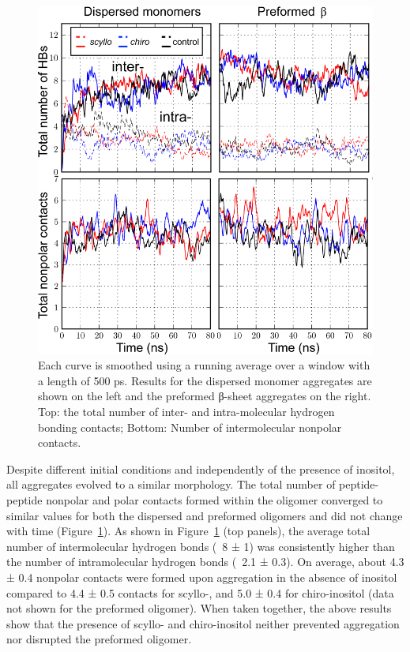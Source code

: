 \begin{figure}[htbp]
  \centering
  \includegraphics[width=4.5in]{figures/results1/GA4_paper_figures_submitted-5}
  \caption[Time evolution of peptide-peptide nonpolar and hydrogen bonding contacts in disordered aggregates in presence and absence of inositol (control).]{Each curve is smoothed using a running average over a window with a length of 500 ps. Results for the dispersed monomer aggregates are shown on the left and the preformed β-sheet aggregates on the right. Top: the total number of inter- and intra-molecular hydrogen bonding contacts; Bottom: Number of intermolecular nonpolar contacts.}
   \label{fig:figure5}
\end{figure}
  
Despite different initial conditions and independently of the presence of inositol, all aggregates evolved to a similar morphology. The total number of peptide-peptide nonpolar and polar contacts formed within the oligomer converged to similar values for both the dispersed and preformed oligomers and did not change with time (Figure~\ref{fig:figure5}). As shown in Figure~\ref{fig:figure5} (top panels), the average total number of intermolecular hydrogen bonds (~8 ± 1) was consistently \bbridge higher than the number of intramolecular hydrogen bonds (~2.1 ± 0.3). On average, about 4.3 ± 0.4 nonpolar contacts were formed upon aggregation in the absence of inositol compared to 4.4 ± 0.5 contacts for scyllo-, and 5.0 ± 0.4 for chiro-inositol (data not shown for the preformed oligomer). When taken together, the above results show that the presence of scyllo- and chiro-inositol neither prevented aggregation nor disrupted the preformed oligomer.

